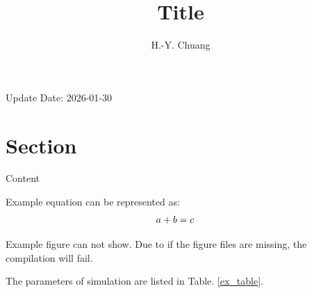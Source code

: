 \documentclass[journal,onecolumn]{IEEEtran}
\begin{document}
\title{Title}

\author{H.-Y. Chuang}

\maketitle
{}

Update Date: 2026-01-30

\section{Section}

Content

Example equation can be represented as:
\begin{eqnarray}
&&\hspace{-0.3in} a + b = c
\nonumber 
\end{eqnarray}

Example figure can not show.
Due to if the figure files are missing, the compilation will fail.

  
The parameters of simulation are listed in Table. \ref{ex_table}.
\end{document}
